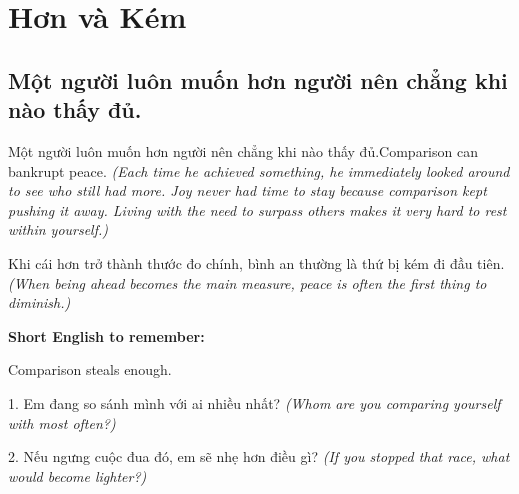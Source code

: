 \chapter{Hơn và Kém}

\section{Một người luôn muốn hơn người nên chẳng khi nào thấy đủ.}
\begin{truyen}{Một người luôn muốn hơn người nên chẳng khi nào thấy đủ.}{Comparison can bankrupt peace.}
\textit{(Each time he achieved something, he immediately looked around to see who still had more. Joy never had time to stay because comparison kept pushing it away. Living with the need to surpass others makes it very hard to rest within yourself.)}
\end{truyen}
\begin{baihoc}
Khi cái hơn trở thành thước đo chính, bình an thường là thứ bị kém đi đầu tiên.
\textit{(When being ahead becomes the main measure, peace is often the first thing to diminish.)}
\end{baihoc}
\begin{ghinhoanh}
\textbf{Short English to remember:}

Comparison steals enough.
\end{ghinhoanh}
\begin{tuhocnhanh}
1. Em đang so sánh mình với ai nhiều nhất? \textit{(Whom are you comparing yourself with most often?)}

2. Nếu ngưng cuộc đua đó, em sẽ nhẹ hơn điều gì? \textit{(If you stopped that race, what would become lighter?)}
\end{tuhocnhanh}
\ngancach

